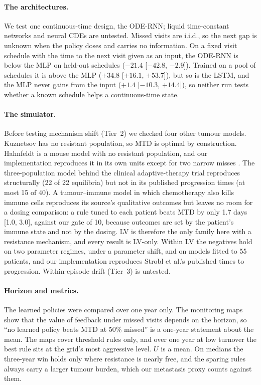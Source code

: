 \documentclass[10pt]{article}
\renewcommand{\cite}{\citep}  %
\begin{document}
\paragraph{The architectures.} We test one continuous-time design, the ODE-RNN;
liquid time-constant networks \cite{hasani2021} and neural CDEs
\cite{kidger2020} are untested. Missed visits are i.i.d., so the next gap is
unknown when the policy doses and carries no information. On a fixed visit
schedule with the time to the next visit given as an input, the ODE-RNN is below
the MLP on held-out schedules ($-21.4$ [$-42.8$, $-2.9$]). Trained on a pool of
schedules it is above the MLP ($+34.8$ [$+16.1$, $+53.7$]), but so is the LSTM,
and the MLP never gains from the input ($+1.4$ [$-10.3$, $+14.4$]), so neither
run tests whether a known schedule helps a continuous-time state.

\paragraph{The simulator.} Before testing mechanism shift (Tier~2) we checked
four other tumour models. Kuznetsov has no resistant population, so MTD is
optimal by construction. Hahnfeldt is a mouse model with no resistant
population, and our implementation reproduces it in its own units except for
two narrow misses \cite{hahnfeldt1999}. The three-population model behind the
clinical adaptive-therapy trial \cite{zhang2017} reproduces structurally (22 of
22 equilibria) but not in its published progression times (at most 15 of 40).
A tumour--immune model in which chemotherapy also kills immune cells
\cite{depillis2006} reproduces its source's qualitative outcomes but leaves no
room for a dosing comparison: a rule tuned to each patient beats MTD by only 1.7
days [1.0, 3.0], against our gate of 10, because outcomes are set by the
patient's immune state and not by the dosing. %
LV is therefore the only family here with a resistance mechanism, and every
result is LV-only. Within LV the negatives hold on two parameter regimes, under
a parameter shift, and on models fitted to 55 patients, and our implementation
reproduces Strobl et al.'s published times to progression. Within-episode drift
(Tier~3) is untested.

\paragraph{Horizon and metrics.} The learned policies were compared over one
year only. The monitoring maps show that the value of feedback under missed
visits depends on the horizon, so ``no learned policy beats MTD at 50\% missed''
is a one-year statement about the mean. The maps cover threshold rules only, and
over one year at low turnover the best rule sits at the grid's most aggressive
level. $U$ is a mean. On medians the three-year win holds only where resistance
is nearly free, and the sparing rules always carry a larger tumour burden, which
our metastasis proxy counts against them.
\end{document}
